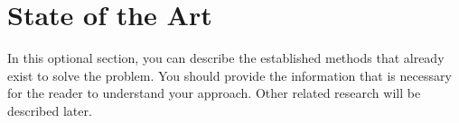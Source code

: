 \section{State of the Art}\label{sec:sota}
In this optional section, you can describe the established methods that already exist to solve the problem.
You should provide the information that is necessary for the reader to understand your approach. 
Other related research will be described later.

